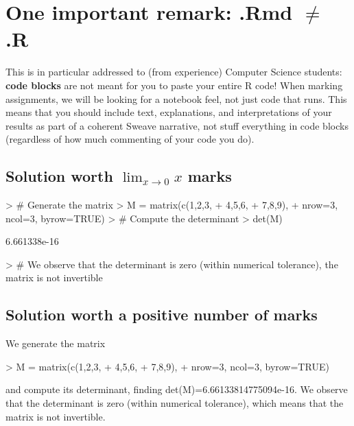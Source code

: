 \documentclass{article}
\begin{document}
\section{One important remark: .Rmd $\neq$ .R}

This is in particular addressed to (from experience) Computer Science students: \textbf{code blocks} are not meant for you to paste your entire R code!
When marking assignments, we will be looking for a notebook feel, not just code that runs. 
This means that you should include text, explanations, and interpretations of your results as part of a coherent Sweave narrative, not stuff everything in code blocks (regardless of how much commenting of your code you do).

\subsection{Solution worth $\lim_{x \to 0} x$ marks}

\begin{Schunk}
\begin{Sinput}
> # Generate the matrix
> M = matrix(c(1,2,3,
+              4,5,6,
+              7,8,9), 
+            nrow=3, ncol=3, byrow=TRUE)
> # Compute the determinant
> det(M)
\end{Sinput}
\begin{Soutput}
[1] 6.661338e-16
\end{Soutput}
\begin{Sinput}
> # We observe that the determinant is zero (within numerical tolerance), the matrix is not invertible
\end{Sinput}
\end{Schunk}

\subsection{Solution worth a positive number of marks}
We generate the matrix
\begin{Schunk}
\begin{Sinput}
> M = matrix(c(1,2,3,
+              4,5,6,
+              7,8,9), 
+            nrow=3, ncol=3, byrow=TRUE)
\end{Sinput}
\end{Schunk}
and compute its determinant, finding det(M)=6.66133814775094e-16. We observe that the determinant is zero (within numerical tolerance), which means that the matrix is not invertible.
\end{document}
